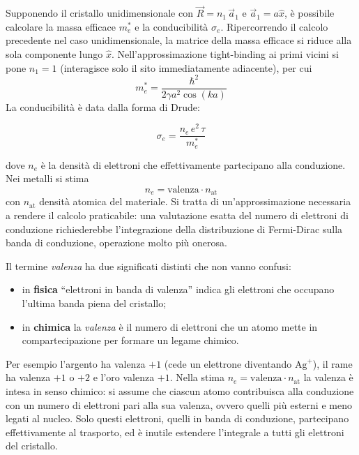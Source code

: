 \begin{solution}
    Supponendo il cristallo unidimensionale con \( \vec{R} = n_1 \, \vec{a}_1 \) e \( \vec{a}_1 = a \hat{x} \), è possibile calcolare la massa efficace \( m_e^* \) e la conducibilità \( \sigma_e \).
    Ripercorrendo il calcolo precedente nel caso unidimensionale, la matrice della massa efficace si riduce alla sola componente lungo \( \hat{x} \). Nell'approssimazione tight-binding ai primi vicini si pone \( n_1 = 1 \) (interagisce solo il sito immediatamente adiacente), per cui
    \begin{equation}
        m_e^* = \frac{\hbar^2}{2 \gamma a^2 \cos(k a)}
    \end{equation}
    La conducibilità è data dalla forma di Drude:
    \begin{importantbox}
        \begin{equation}
            \sigma_e = \frac{n_e \, e^2 \, \tau}{m_e^*}
        \end{equation}
    \end{importantbox}
    dove \( n_e \) è la densità di elettroni che effettivamente partecipano alla conduzione. Nei metalli si stima
    \begin{equation}
        n_e = \text{valenza} \cdot n_{\text{at}}
    \end{equation}
    con \( n_{\text{at}} \) densità atomica del materiale. Si tratta di un'approssimazione necessaria a rendere il calcolo praticabile: una valutazione esatta del numero di elettroni di conduzione richiederebbe l'integrazione della distribuzione di Fermi-Dirac sulla banda di conduzione, operazione molto più onerosa.
\end{solution}

\begin{remark}
    Il termine \emph{valenza} ha due significati distinti che non vanno confusi:
    \begin{itemize}
        \item in \textbf{fisica} ``elettroni in banda di valenza'' indica gli elettroni che occupano l'ultima banda piena del cristallo;
        \item in \textbf{chimica} la \emph{valenza} è il numero di elettroni che un atomo mette in compartecipazione per formare un legame chimico.
    \end{itemize}
    Per esempio l'argento ha valenza \( +1 \) (cede un elettrone diventando \( \text{Ag}^+ \)), il rame ha valenza \( +1 \) o \( +2 \) e l'oro valenza \( +1 \). Nella stima \( n_e = \text{valenza} \cdot n_{\text{at}} \) la valenza è intesa in senso chimico: si assume che ciascun atomo contribuisca alla conduzione con un numero di elettroni pari alla sua valenza, ovvero quelli più esterni e meno legati al nucleo. Solo questi elettroni, quelli in banda di conduzione, partecipano effettivamente al trasporto, ed è inutile estendere l'integrale a tutti gli elettroni del cristallo.
\end{remark}

